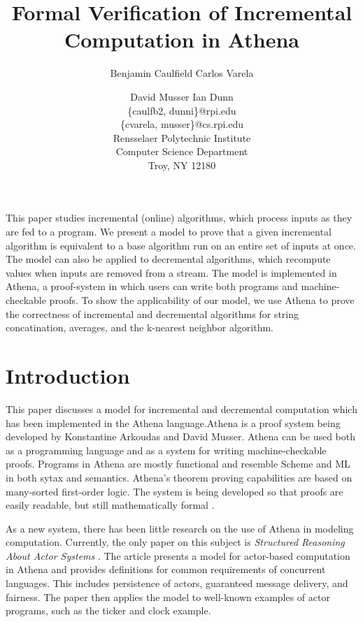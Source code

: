 \documentclass[30pt]{article}
\begin{document}
\title{Formal Verification of Incremental Computation in Athena}
\author{
 	Benjamin Caulfield \qquad Carlos Varela \\
	\and
	David Musser \qquad Ian Dunn\\
	\{caulfb2, dunni\}@rpi.edu\\
	\{cvarela, musser\}@cs.rpi.edu\\
	 Rensselaer Polytechnic Institute\\
        	Computer Science Department\\
        	Troy, NY 12180\\
}

\maketitle

\abstract
\large

\indent This paper studies incremental (online) algorithms, which process inputs as they are fed to a program. We present a model to prove that a given incremental algorithm is equivalent to a base algorithm run on an entire set of inputs at once. The model can also be applied to decremental algorithms, which recompute values when inputs are removed from a stream. The model is implemented in Athena, a proof-system in which users can write both programs and machine-checkable proofs. To show the applicability of our model, we use Athena to prove the correctness of incremental and decremental algorithms for string concatination, averages, and the k-nearest neighbor algorithm.


\section{Introduction}
\large

\indent This paper discusses a model for incremental and decremental computation which has been implemented in the Athena language.Athena is a proof system being developed by Konstantine Arkoudas and David Musser. Athena can be used both as a programming language and as a system for writing machine-checkable proofs. Programs in Athena are mostly functional and resemble Scheme and ML in both sytax and semantics. Athena's theorem proving capabilities are based on many-sorted first-order logic. The system is being developed so that proofs are easily readable, but still mathematically formal \cite{Musser12, Musser13}.

\indent As a new system, there has been little research on the use of Athena in modeling computation. Currently, the only paper on this subject is \emph{Structured Reasoning About Actor Systems} \cite{Varela13}. The article presents a model for actor-based computation in Athena and provides definitions for common requirements of concurrent languages. This includes persistence of actors, guaranteed message delivery, and fairness. The paper then applies the model to well-known examples of actor programs, such as the ticker and clock example. 
\end{document}
